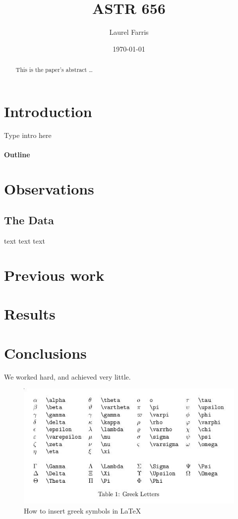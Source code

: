 \documentclass[12pt]{article}
\title{ASTR 656}
\author{Laurel Farris}
\date{\today}
\begin{document}

\maketitle

\begin{abstract}
This is the paper's abstract \ldots  %
\end{abstract}

\section{Introduction}
Type intro here
\paragraph{Outline}  %
\section{Observations}
  \subsection{The Data}
  text text text
\section{Previous work}\label{previous work}
\section{Results}\label{results}
\section{Conclusions}\label{conclusions}
We worked hard, and achieved very little.





\begin{figure}[h]   %
\centering
\includegraphics[width=5.0in]{GreekSymbols.jpg}
\caption{How to insert greek symbols in LaTeX}
\label{greek}
\end{figure}
\end{document}

